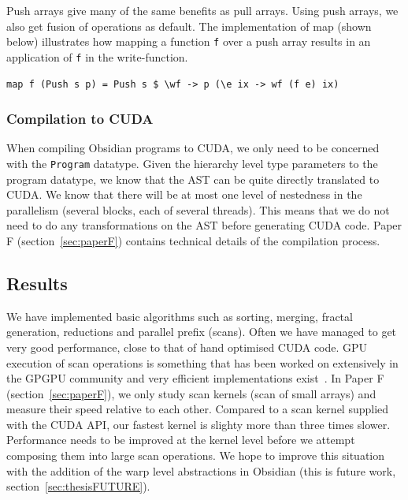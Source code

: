 \documentclass[a4paper]{book}
\begin{document}
Push arrays give many of the same benefits as pull arrays. Using push 
arrays, we also get fusion of operations as default. The implementation of map 
(shown below) illustrates how mapping a function {\tt f} over a push array results 
in an application of {\tt f} in the write-function. 

\begin{verbatim} 
map f (Push s p) = Push s $ \wf -> p (\e ix -> wf (f e) ix)
\end{verbatim}

\subsubsection{Compilation to CUDA}

When compiling Obsidian programs to CUDA, we only need to be concerned with the 
{\tt Program} datatype. Given the hierarchy level type parameters to the program datatype, 
we know that the AST can be quite directly translated to CUDA. We know that there will 
be at most one level of nestedness in the parallelism (several blocks, each of several threads). 
This means that we do not need to do any transformations on the AST before generating CUDA code. 
Paper F (section~\ref{sec:paperF}) contains technical details of the compilation process. 

\subsection{Results}
\FloatBarrier 

We have implemented basic algorithms such as sorting, merging, fractal generation, reductions 
and parallel prefix (scans). Often we have managed to get very good performance, close to that 
of hand optimised CUDA code. GPU execution of scan operations is something that has 
been worked on extensively in the GPGPU community and very efficient implementations 
exist~\citet{merrill,ScanCUDA,OLAMARCUS,EFFICIENTSCAN}. In Paper F (section~\ref{sec:paperF}), 
we only study scan kernels (scan of small arrays) and measure their speed relative to each other. 
Compared to a scan kernel supplied with the CUDA API, our fastest kernel is slighty more 
than three times slower. Performance needs to be improved at the kernel level before we attempt 
composing them into large scan operations. We hope to improve this situation with the 
addition of the warp level abstractions in Obsidian (this is future work, 
section~\ref{sec:thesisFUTURE}). 
\end{document}
